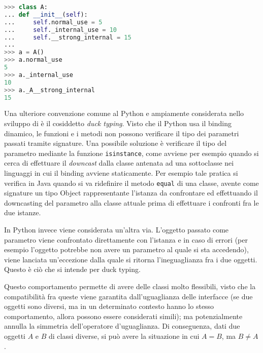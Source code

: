 \captionsetup{justification=centering}
\begin{lstlisting}[language=Python, frame=topline, caption=Convenzioni per l'uso interno.]
>>> class A:
...	def __init__(self):
...		self.normal_use = 5
...		self._internal_use = 10
...		self.__strong_internal = 15
...
>>> a = A()
>>> a.normal_use
5
>>> a._internal_use
10
>>> a._A__strong_internal
15
\end{lstlisting}
\captionsetup{justification=justified}

Una ulteriore convenzione comune al Python e ampiamente considerata
nello sviluppo di \pygfa è il cosiddetto \emph{duck typing}.
Visto che il Python usa il binding dinamico, le funzioni e i metodi non
possono verificare il tipo dei parametri passati tramite signature.
Una possibile soluzione è verificare il tipo del parametro mediante
la funzione \texttt{isinstance}, come avviene per esempio quando
si cerca di effettuare il \emph{downcast} dalla classe antenata
ad una sottoclasse nei linguaggi in cui il binding avviene staticamente.
Per esempio tale pratica si verifica in Java quando si va ridefinire il metodo
\texttt{equal} di una classe, avente come signature un tipo Object rappresentante
l'istanza da confrontare ed effettuando il downcasting del parametro alla classe
attuale prima di effettuare i confronti fra le due istanze.

In Python invece viene considerata un'altra via. L'oggetto passato come
parametro viene confrontato direttamente con l'istanza e in caso
di errori (per esempio l'oggetto potrebbe non avere un parametro al quale
si sta accedendo), viene lanciata un'eccezione dalla quale si ritorna l'ineguaglianza
fra i due oggetti. Questo è ciò che si intende per duck typing.

Questo comportamento permette di avere delle classi molto flessibili,
visto che la compatibilità fra queste viene garantita dall'uguaglianza
delle interfacce (se due oggetti sono diversi, ma in un determinato
contesto hanno lo stesso comportamento, allora possono essere considerati
simili); ma potenzialmente annulla la simmetria dell'operatore d'uguaglianza.
Di conseguenza, dati due oggetti $A$ e $B$ di classi diverse, si può
avere la situazione in cui $A = B$, ma $B \neq A$.

